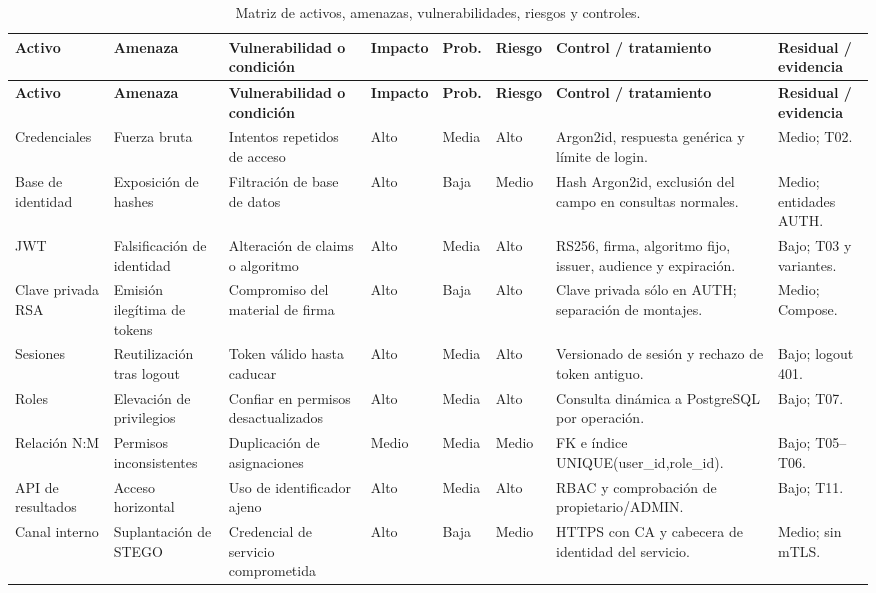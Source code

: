 \documentclass[11pt,a4paper,oneside]{article}
\begin{document}
\begin{landscape}
\scriptsize\setlength{\tabcolsep}{3pt}\renewcommand{\arraystretch}{1.2}
\begin{longtable}{@{}P{2.45cm}P{3.15cm}P{3.7cm}P{1.7cm}P{1.7cm}P{1.8cm}P{5.5cm}P{3.15cm}@{}}
\caption{Matriz de activos, amenazas, vulnerabilidades, riesgos y controles.}\label{tab:riesgos}\\
\toprule
\textbf{Activo} & \textbf{Amenaza} & \textbf{Vulnerabilidad o condición} & \textbf{Impacto} & \textbf{Prob.} & \textbf{Riesgo} & \textbf{Control / tratamiento} & \textbf{Residual / evidencia}\\\midrule
\endfirsthead
\toprule\textbf{Activo}&\textbf{Amenaza}&\textbf{Vulnerabilidad o condición}&\textbf{Impacto}&\textbf{Prob.}&\textbf{Riesgo}&\textbf{Control / tratamiento}&\textbf{Residual / evidencia}\\\midrule\endhead
Credenciales & Fuerza bruta & Intentos repetidos de acceso & Alto & Media & Alto & Argon2id, respuesta genérica y límite de login. & Medio; T02.\\
Base de identidad & Exposición de hashes & Filtración de base de datos & Alto & Baja & Medio & Hash Argon2id, exclusión del campo en consultas normales. & Medio; entidades AUTH.\\
JWT & Falsificación de identidad & Alteración de claims o algoritmo & Alto & Media & Alto & RS256, firma, algoritmo fijo, issuer, audience y expiración. & Bajo; T03 y variantes.\\
Clave privada RSA & Emisión ilegítima de tokens & Compromiso del material de firma & Alto & Baja & Alto & Clave privada sólo en AUTH; separación de montajes. & Medio; Compose.\\
Sesiones & Reutilización tras logout & Token válido hasta caducar & Alto & Media & Alto & Versionado de sesión y rechazo de token antiguo. & Bajo; logout 401.\\
Roles & Elevación de privilegios & Confiar en permisos desactualizados & Alto & Media & Alto & Consulta dinámica a PostgreSQL por operación. & Bajo; T07.\\
Relación N:M & Permisos inconsistentes & Duplicación de asignaciones & Medio & Media & Medio & FK e índice UNIQUE(user\_id,role\_id). & Bajo; T05--T06.\\
API de resultados & Acceso horizontal & Uso de identificador ajeno & Alto & Media & Alto & RBAC y comprobación de propietario/ADMIN. & Bajo; T11.\\
Canal interno & Suplantación de STEGO & Credencial de servicio comprometida & Alto & Baja & Medio & HTTPS con CA y cabecera de identidad del servicio. & Medio; sin mTLS.\\

\end{longtable}
\end{landscape}
\end{document}

